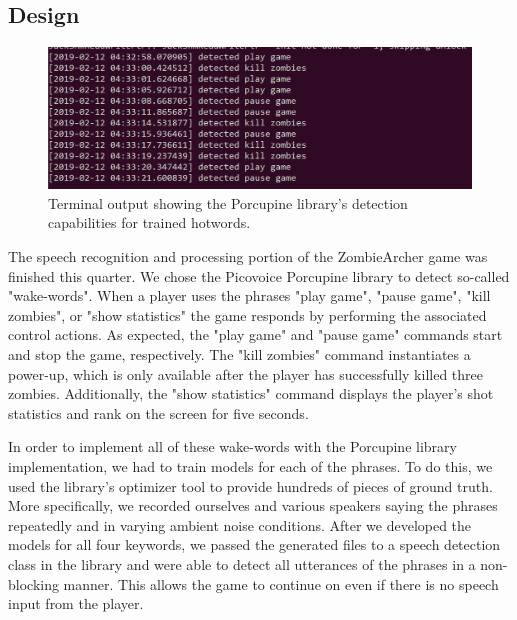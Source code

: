 \documentclass[titlepage, 12pt]{scrartcl}
\begin{document}
    \subsection{Design}
        \begin{figure}
            \centering
            \includegraphics{figures/speech_recognition.PNG}
            \caption{Terminal output showing the Porcupine library’s detection capabilities for trained hotwords.}
            \label{fig:speech_recognition}
        \end{figure}
        The speech recognition and processing portion of the ZombieArcher game was finished this quarter. We chose the Picovoice Porcupine library to detect so-called "wake-words". When a player uses the phrases "play game", "pause game", "kill zombies", or "show statistics" the game responds by performing the associated control actions. As expected, the "play game" and "pause game" commands start and stop the game, respectively. The "kill zombies" command instantiates a power-up, which is only available after the player has successfully killed three zombies. Additionally, the "show statistics" command displays the player's shot statistics and rank on the screen for five seconds. \par
        In order to implement all of these wake-words with the Porcupine library implementation, we had to train models for each of the phrases. To do this, we used the library's optimizer tool to provide hundreds of pieces of ground truth. More specifically, we recorded ourselves and various speakers saying the phrases repeatedly and in varying ambient noise conditions. After we developed the models for all four keywords, we passed the generated files to a speech detection class in the library and were able to detect all utterances of the phrases in a non-blocking manner. This allows the game to continue on even if there is no speech input from the player. \par
\end{document}

